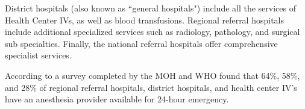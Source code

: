 \documentclass[12pt]{article} %
\begin{document}
District hospitals (also known as ``general hospitals") include all the services of Health Center IVs, as well as blood transfusions.
Regional referral hospitals include additional specialized services such as radiology, pathology, and surgical sub specialties.
Finally, the national referral hospitals offer comprehensive specialist services. 
\cite{UBS2017}

According to a survey completed by the MOH and WHO found that 64\%, 58\%, and 28\% of regional referral hospitals, district hospitals, and health center IV's have an anesthesia provider available for 24-hour emergency. 
\cite{hcsurvey2014}









\end{document}
